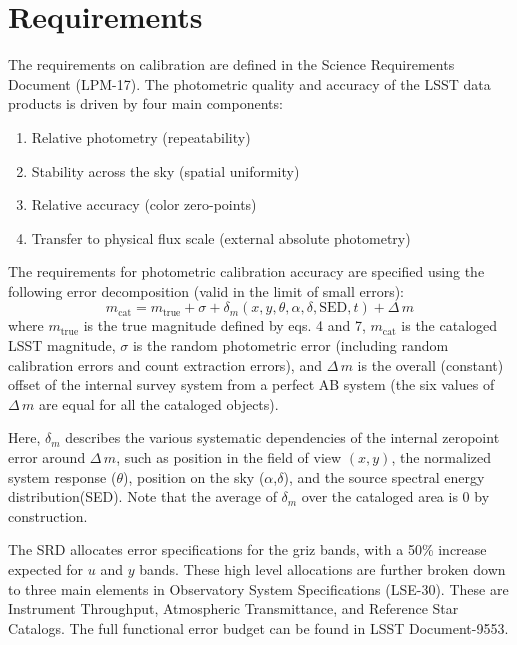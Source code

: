 \documentclass[SE,authoryear,lsstdraft,toc]{lsstdoc}
\newcommand{\mcat}{m_{\mathrm{cat}}}
\newcommand{\mtrue}{m_{\mathrm{true}}}
\newcommand{\deltam}{\delta_m}
\newcommand{\Deltam}{\Delta\,m}
\begin{document}
\section{Requirements}
The requirements on calibration are defined in the Science Requirements Document (LPM-17). The photometric quality and accuracy of the LSST data products is driven by four main components:
\begin{enumerate}
    \item Relative photometry (repeatability)
    \item Stability across the sky (spatial uniformity)
    \item Relative accuracy (color zero-points)
    \item Transfer to physical flux scale (external absolute photometry)
\end{enumerate}

The requirements for photometric calibration accuracy are specified using the
following error decomposition (valid in the limit of small errors):
%
\begin{equation}
    \mcat = \mtrue +\sigma+\deltam (x,y,\theta,\alpha,\delta,\mathrm{SED},t)+\Deltam
\end{equation}
%
where $\mtrue$ is the true magnitude defined by eqs. 4 and 7, $\mcat$ is the
cataloged LSST magnitude, $\sigma$ is the random photometric error (including
random calibration errors and count extraction errors), and $\Deltam$ is the
overall (constant) offset of the internal survey system from a perfect AB
system (the six values of $\Deltam$ are equal for all the cataloged objects).

Here, $\deltam$ describes the various systematic dependencies of the internal
zeropoint error around $\Deltam$, such as position in the field of view $(x,
y)$, the normalized system response ($\theta$), position on the sky
($\alpha$,$\delta$), and the source spectral energy distribution(SED).  Note
that the average of $\deltam$ over the cataloged area is 0 by construction.

The SRD allocates error specifications for the griz bands, with a 50\% increase
expected for $u$ and $y$ bands. These high level allocations are further broken
down to three main elements in Observatory System Specifications
(LSE-30). These are Instrument Throughput, Atmospheric Transmittance, and
Reference Star Catalogs. The full functional error budget can be found in LSST
Document-9553.
\end{document}
